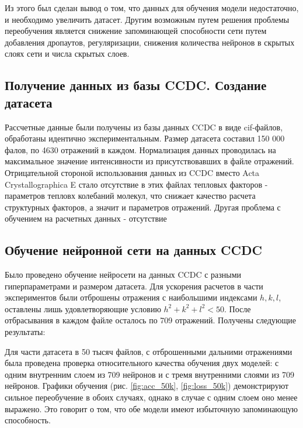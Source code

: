 \documentclass{article}
\begin{document}
Из этого был сделан вывод о том, что данных для обучения модели недостаточно, и необходимо увеличить датасет. Другим возможным путем решения проблемы переобучения является снижение запоминающей способности сети путем добавления дропаутов, регуляризации, снижения количества нейронов в скрытых слоях сети и числа скрытых слоев.

\subsection{Получение данных из базы CCDC. Создание датасета}

Рассчетные данные были получены из базы данных CCDC в виде cif-файлов, обработаны идентично экспериментальным. Размер датасета составил 150 000 фалов, по 4630 отражений в каждом. Нормализация данных проводилась на максимальное значение интенсивности из присутствовавших в файле отражений. Отрицательной стороной использования данных из CCDC вместо Acta Crystallographica E стало отсутствие в этих файлах тепловых факторов - параметров тепловх колебаний молекул, что снижает качество расчета структурных факторов, а значит и параметров отражений. Другая проблема с обучением на расчетных данных - отсутствие  


\subsection{Обучение нейронной сети на данных CCDC}

Было проведено обучение нейросети на данных CCDC с разными гиперпараметрами и размером датасета. Для ускорения расчетов в части экспериментов были отброшены отражения с наибольшими индексами $h,k,l$, оставлены лишь удовлетворяющие условию $h^2+k^2+l^2<50$. После отбрасывания в каждом файле осталось по 709 отражений. Получены следующие результаты:

Для части датасета в 50 тысяч файлов, с отброшенными дальними отражениями была проведена проверка относительного качества обучения двух моделей: с одним внутренним слоем из 709 нейронов и с тремя внутренними слоями из 709 нейронов. Графики обучения (рис. \ref{fig:acc_50k}, \ref{fig:loss_50k}) демонстрируют сильное переобучение в обоих случаях, однако в случае с одним слоем оно менее выражено. Это говорит о том, что обе модели имеют избыточную запоминающую способность.
\end{document}
